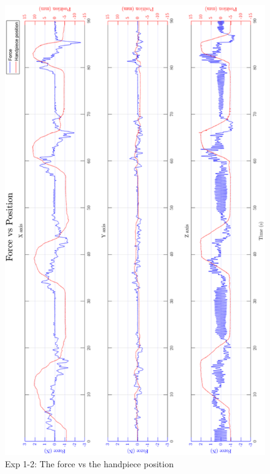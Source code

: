 \begin{figure}[htbp]
\begin{center}
\includegraphics[width=0.9\linewidth]{Images/exp/exp1_1_3.png}
\caption{Exp 1-2: The force vs the handpiece position}
\label{fig: exp1_1_3}
\end{center}
\end{figure}

